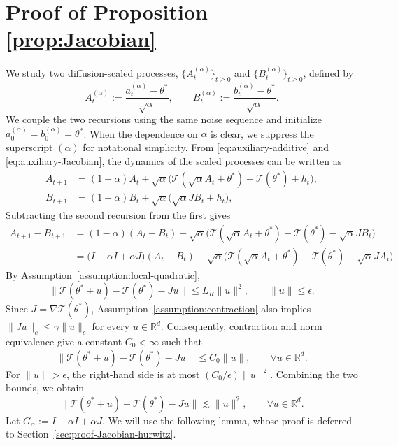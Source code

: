 \documentclass[11pt,letterpaper]{article}
\theoremstyle{plain}
\theoremstyle{definition}
\theoremstyle{remark}
\newcommand{\mT}{\mathcal{T}}
\newcommand{\R}{\mathbb{R}}
\begin{document}
\section{Proof of Proposition  \ref{prop:Jacobian}}\label{sec:proof-Jacobian}
We study two diffusion-scaled processes,
\(\{A_t^{(\alpha)}\}_{t\ge 0}\) and
\(\{B_t^{(\alpha)}\}_{t\ge 0}\), defined by
\[
A_t^{(\alpha)}
:=
\frac{a_t^{(\alpha)}-\theta^*}{\sqrt{\alpha}},
\qquad
B_t^{(\alpha)}
:=
\frac{b_t^{(\alpha)}-\theta^*}{\sqrt{\alpha}}.
\]
We couple the two recursions using the same noise sequence and initialize
\(a_0^{(\alpha)}=b_0^{(\alpha)}=\theta^*\).
When the dependence on \(\alpha\) is clear, we suppress the
superscript \((\alpha)\) for notational simplicity. From \eqref{eq:auxiliary-additive} and \eqref{eq:auxiliary-Jacobian}, the dynamics of the scaled processes
can be written as
\begin{equation}
\begin{aligned}
A_{t+1}
&=
(1-\alpha)A_t
+
\sqrt{\alpha}\big(
\mT(\sqrt{\alpha}A_t+\theta^*)-\mT(\theta^*)+h_t
\big), \\
B_{t+1}
&=
(1-\alpha)B_t
+
\sqrt{\alpha}\big(
\sqrt{\alpha}J B_t+h_t
\big),
\end{aligned}
\end{equation}
Subtracting the second recursion from the
first gives
\begin{align*}
A_{t+1}-B_{t+1}
&=
(1-\alpha)(A_t-B_t) +
\sqrt{\alpha}\Big(
\mT(\sqrt{\alpha}A_t+\theta^*)
-\mT(\theta^*)
-\sqrt{\alpha}J B_t
\Big)\\
&=\big(I-\alpha I+\alpha J\big)(A_t-B_t) +
\sqrt{\alpha}\Big(
\mT(\sqrt{\alpha}A_t+\theta^*)
-\mT(\theta^*)
-\sqrt{\alpha}J A_t
\Big)
\end{align*}
By Assumption~\ref{assumption:local-quadratic},
\[
    \|\mT(\theta^*+u)-\mT(\theta^*)-Ju\|
    \leq L_R\|u\|^2,
    \qquad \|u\|\leq\epsilon.
\]
Since \(J=\nabla\mT(\theta^*)\), Assumption~\ref{assumption:contraction}
also implies \(\|Ju\|_c\leq\gamma\|u\|_c\) for every \(u\in\R^d\).
Consequently, contraction and norm equivalence give a constant \(C_0<\infty\)
such that
\[
    \|\mT(\theta^*+u)-\mT(\theta^*)-Ju\|
    \leq C_0\|u\|,
    \qquad \forall u\in\R^d.
\]
For \(\|u\|>\epsilon\), the right-hand side is at most
\((C_0/\epsilon)\|u\|^2\). Combining the two bounds, we obtain
\begin{equation}\label{eq:quadratic-remainder}
    \|\mT(\theta^*+u)-\mT(\theta^*)-Ju\|
    \lesssim \|u\|^2,
    \qquad \forall u\in\R^d.
\end{equation}
Let $G_\alpha:=I-\alpha I+\alpha J$. We will use the following lemma, whose proof is deferred to Section~\ref{sec:proof-Jacobian-hurwitz}.
\end{document}
